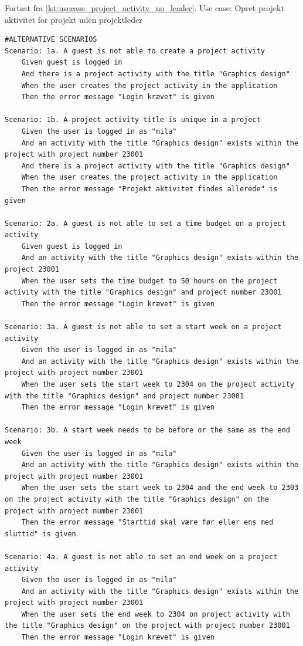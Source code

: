 \begin{listing}[H]
    \centering
    \caption{Fortsat fra \cref{lst:usecase_project_activity_no_leader}. Use case: Opret projekt aktivitet for projekt uden projektleder} \label{lst:usecase_project_activity_no_leader_2}
    \begin{verbatim}
#ALTERNATIVE SCENARIOS
Scenario: 1a. A guest is not able to create a project activity
    Given guest is logged in
    And there is a project activity with the title "Graphics design"  
    When the user creates the project activity in the application 
    Then the error message "Login krævet" is given

Scenario: 1b. A project activity title is unique in a project
    Given the user is logged in as "mila"
    And an activity with the title "Graphics design" exists within the project with project number 23001
    And there is a project activity with the title "Graphics design"  
    When the user creates the project activity in the application 
    Then the error message "Projekt aktivitet findes allerede" is given

Scenario: 2a. A guest is not able to set a time budget on a project activity
    Given guest is logged in
    And an activity with the title "Graphics design" exists within the project 23001
    When the user sets the time budget to 50 hours on the project activity with the title "Graphics design" and project number 23001
    Then the error message "Login krævet" is given

Scenario: 3a. A guest is not able to set a start week on a project activity
    Given the user is logged in as "mila"
    And an activity with the title "Graphics design" exists within the project with project number 23001
    When the user sets the start week to 2304 on the project activity with the title "Graphics design" and project number 23001
    Then the error message "Login krævet" is given

Scenario: 3b. A start week needs to be before or the same as the end week
    Given the user is logged in as "mila"
    And an activity with the title "Graphics design" exists within the project with project number 23001
    When the user sets the start week to 2304 and the end week to 2303 on the project activity with the title "Graphics design" on the project with project number 23001
    Then the error message "Starttid skal være før eller ens med sluttid" is given

Scenario: 4a. A guest is not able to set an end week on a project activity
    Given the user is logged in as "mila"
    And an activity with the title "Graphics design" exists within the project with project number 23001
    When the user sets the end week to 2304 on project activity with the title "Graphics design" on the project with project number 23001
    Then the error message "Login krævet" is given


\end{verbatim}
\end{listing}
